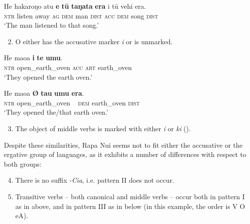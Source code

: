 \ea\label{ex:8.3}
\gll He hakaroŋo atu \textbf{e} \textbf{tū} \textbf{taŋata} \textbf{era} i tū vehi era.\\
\textsc{ntr} listen away \textsc{ag} \textsc{dem} man \textsc{dist} \textsc{acc} \textsc{dem} song \textsc{dist}\\

\glt
‘The man listened to that song.’ \textstyleExampleref{[R310.196]} 
\z
\begin{enumerate}
\setcounter{enumi}{1}
\item 
O either has the accusative marker \textit{i} or is unmarked.
\end{enumerate}

\ea\label{ex:8.4}
\gll He ma{\ꞌ}oa \textbf{i} \textbf{te} \textbf{{\ꞌ}umu}.\\
\textsc{ntr} open\_earth\_oven \textsc{acc} \textsc{art} earth\_oven\\

\glt 
‘They opened the earth oven.’ \textstyleExampleref{[Mtx-3-01.168]}
\z

\ea\label{ex:8.5}
\gll He ma{\ꞌ}oa  \textbf{\textup{Ø}} \textbf{tau} \textbf{{\ꞌ}umu} \textbf{era}.\\
\textsc{ntr} open\_earth\_oven ~ \textsc{dem} earth\_oven \textsc{dist}\\

\glt
‘They opened the/that earth oven.’ \textstyleExampleref{[Mtx-3-11.062]}
\z

\begin{enumerate}
\setcounter{enumi}{2}
\item 
The object of middle verbs is marked with either \textit{i} or \textit{ki} ().
\end{enumerate}

Despite these similarities, Rapa Nui seems not to fit either the accusative or the ergative group of languages, as it exhibits a number of differences with respect to both groups:

\begin{enumerate}
\setcounter{enumi}{3} 
\item 
There is no suffix \textit{-Cia}, i.e. pattern II does not occur.

\item 
Transitive verbs – both canonical and middle verbs – occur both in pattern I as in  above, and in pattern III as in  below (in this example, the order is V O eA).
\end{enumerate}

